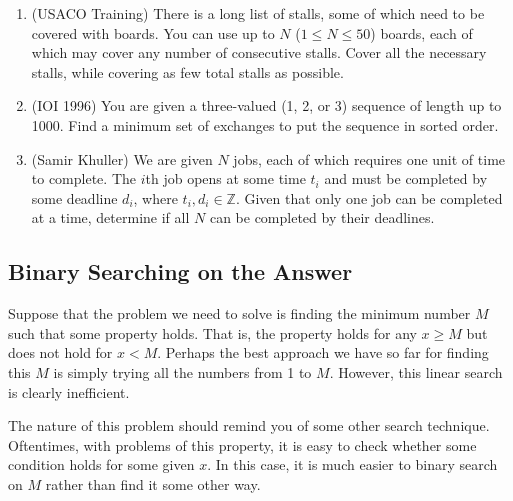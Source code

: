 \documentclass[11pt]{book}
\begin{document}
\begin{enumerate}

\item
(USACO Training)
There is a long list of stalls, some of which need to be covered with boards. You can use up to $N$ ($1 \le N \le 50$) boards, each of which may cover any number of consecutive stalls. Cover all the necessary stalls, while covering as few total stalls as possible.

\item
(IOI 1996)
You are given a three-valued (1, 2, or 3) sequence of length up to 1000. Find a minimum set of exchanges to put the sequence in sorted order.

\item
(Samir Khuller)
We are given $N$ jobs, each of which requires one unit of time to complete. The $i$th job opens at some time $t_i$ and must be completed by some deadline $d_i$, where $t_i,d_i\in \mathbb{Z}$. Given that only one job can be completed at a time, determine if all $N$ can be completed by their deadlines.

\end{enumerate}

\subsection{Binary Searching on the Answer}

Suppose that the problem we need to solve is finding the minimum number $M$ such that some property holds. That is, the property holds for any $x \ge M$ but does not hold for $x < M$. Perhaps the best approach we have so far for finding this $M$ is simply trying all the numbers from 1 to $M$. However, this linear search is clearly inefficient.

The nature of this problem should remind you of some other search technique. Oftentimes, with problems of this property, it is easy to check whether some condition holds for some given $x$. In this case, it is much easier to binary search on $M$ rather than find it some other way.
\end{document}

